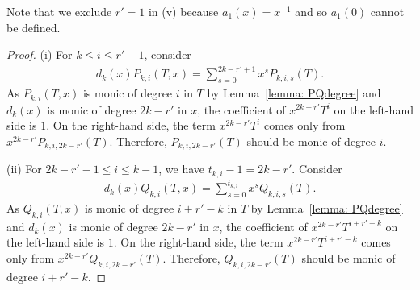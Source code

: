 \documentclass[11pt]{amsart}
\theoremstyle{definition}
\numberwithin{equation}{subsection}
\theoremstyle{plain}
\theoremstyle{plain}
\theoremstyle{plain}
\theoremstyle{plain}
\theoremstyle{plain}
\theoremstyle{plain}
\theoremstyle{plain}
\theoremstyle{plain}
\theoremstyle{plain}
\theoremstyle{plain}
\theoremstyle{plain}
\theoremstyle{plain}
\theoremstyle{definition}
\theoremstyle{definition}
\theoremstyle{definition}
\theoremstyle{remark}
\renewcommand{\(}{\textup{(}}
\renewcommand{\)}{\textup{)}}
\begin{document}
Note that we exclude $r'=1$ in (v) because $a_1(x)=x^{-1}$ and so $a_1(0)$ cannot be defined.

\begin{proof}
(i) For $k\leq i\leq r'-1$, consider
    \begin{align*}
        d_k(x)P_{k,i}(T,x)
        =\sum_{s=0}^{2k-r'+1}x^sP_{k,i,s}(T).
    \end{align*}
As $P_{k,i}(T,x)$ is monic of degree $i$ in $T$ by Lemma~\ref{lemma: PQdegree} and $d_k(x)$ is monic of degree $2k-r'$ in $x$, the coefficient of $x^{2k-r'}T^i$ on the left-hand side is $1$. On the right-hand side, the term $x^{2k-r'}T^i$ comes only from $x^{2k-r'}P_{k,i,2k-r'}(T)$. Therefore, $P_{k,i,2k-r'}(T)$ should be monic of degree $i$.

(ii) For $2k-r'-1\leq i\leq k-1$, we have $t_{k,i}-1=2k-r'$. Consider
    \begin{align*}
        d_k(x)Q_{k,i}(T,x)
        =\sum_{s=0}^{t_{k,i}}x^sQ_{k,i,s}(T).
    \end{align*}
As $Q_{k,i}(T,x)$ is monic of degree $i+r'-k$ in $T$ by Lemma~\ref{lemma: PQdegree} and $d_k(x)$ is monic of degree $2k-r'$ in $x$, the coefficient of $x^{2k-r'}T^{i+r'-k}$ on the left-hand side is $1$. On the right-hand side, the term $x^{2k-r'}T^{i+r'-k}$ comes only from $x^{2k-r'}Q_{k,i,2k-r'}(T)$. Therefore, $Q_{k,i,2k-r'}(T)$ should be monic of degree $i+r'-k$.


\end{proof}
\end{document}
